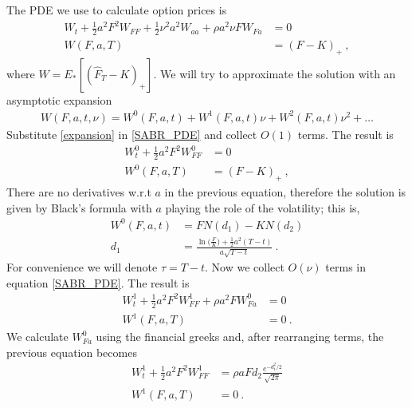 \documentclass[10pt]{article}
\numberwithin{equation}{section}
\begin{document}
The PDE we use to calculate option prices is
\begin{equation}\label{SABR_PDE}
	\begin{split}
	W_t + \frac{1}{2} a^2 F^2 W_{FF}+ \frac{1}{2} \nu^2 a^2 W_{aa}  + \rho a^2 \nu F W_{Fa}&=0\\
	W(F,a,T)&=(F-K)_{+}\:,
	\end{split}
\end{equation}
where $W=E_{*}[(\widehat{F}_{T}-K)_{+}]$. We will try to approximate the solution with an asymptotic expansion
\begin{equation}\label{expansion}
	\begin{split}
	W(F,a,t,\nu) = W^{0}(F,a,t) + W^{1}(F,a,t) \nu + W^{2}(F,a,t) \nu^2 +\ldots
	\end{split}
\end{equation}
Substitute \eqref{expansion} in \eqref{SABR_PDE} and collect $O(1)$ terms. The result is
\begin{equation}\label{order_0}
	\begin{split}
	W_t^{0} + \frac{1}{2}  a^2 F^2 W_{FF}^{0}&=0\\
	W^{0}(F,a,T)&=(F-K)_{+}\:,
	\end{split}
\end{equation}
There are no derivatives w.r.t $a$ in the previous equation, therefore the solution is given by Black's formula with $a$ playing the role of the volatility; this is,
\begin{equation*}
	\begin{split}
	W^{0}(F,a,t)&= FN(d_1)-KN(d_2)\\
	d_{1}&=\frac{\ln\bigl( \frac{F}{K}\bigr)+\frac{1}{2} a^2 (T-t)}{a\sqrt{T-t}}\:.
	\end{split}
\end{equation*}
For convenience we will denote $\tau = T -t$. Now we collect $O(\nu)$ terms in equation \eqref{SABR_PDE}. The result is
\begin{equation}
	\begin{split}
	W_t^{1} + \frac{1}{2}  a^2 F^2 W_{FF}^{1}+\rho a^2 F W_{Fa}^{0}&=0\\
	W^{1}(F,a,T)&=0\:.
	\end{split}
\end{equation}
We calculate $W_{Fa}^{0}$ using the financial greeks and, after rearranging terms, the previous equation becomes
\begin{equation}\label{order_1}
	\begin{split}
	W_t^{1} + \frac{1}{2}  a^2 F^2 W_{FF}^{1} &=\rho a  F d_2 \frac{e^{-d_1^2 / 2}}{\sqrt{2\pi}}\\
	W^{1}(F,a,T)&=0\:.
	\end{split}
\end{equation}
\end{document}

